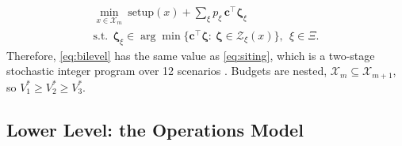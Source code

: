 \begin{equation}\label{eq:bilevel}
  \begin{gathered}
  \min_{x\in\mathcal X_m}\ \mathrm{setup}(x)+\textstyle\sum_{\xi}p_\xi\,\mathbf c^\top\boldsymbol\zeta_\xi\\
  \text{s.t.}\ \ \boldsymbol\zeta_\xi\in\arg\min\{\mathbf c^\top\boldsymbol\zeta:\ \boldsymbol\zeta\in\mathcal Z_\xi(x)\},\ \ \xi\in\Xi.
  \end{gathered}
\end{equation}
Therefore, \eqref{eq:bilevel} has the same value as \eqref{eq:siting}, which is a two-stage stochastic integer program over 12 scenarios \cite{birge2011introduction}. Budgets are nested, $\mathcal X_m\subseteq\mathcal X_{m+1}$, so $V^*_1\ge V^*_2\ge V^*_3$.

\providecommand{\rSC}{\textsf{SC}}
\providecommand{\rS}{\textsf{S}}
\providecommand{\rC}{\textsf{C}}
\providecommand{\OPEX}{\mathrm{OPEX}}
\providecommand{\UB}{\mathrm{UB}}
\providecommand{\LB}{\mathrm{LB}}
\providecommand{\Vopen}{V^{\mathrm{open}}}
\providecommand{\Vall}{V^{\mathrm{all}}}

\subsection{Lower Level: the Operations Model}\label{sec:model}\label{sec:model:ops}

